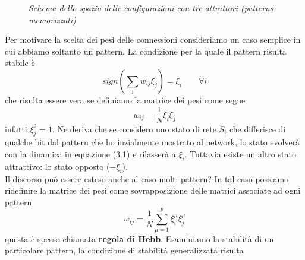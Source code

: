 \documentclass[12pt, a4paper]{book}
\theoremstyle{theorem}
\begin{document}
\begin{figure}
					\caption{\textit{Schema dello spazio delle configurazioni con tre attrattori (patterns memorizzati)}}
				\end{figure}
				
				Per motivare la scelta dei pesi delle connessioni consideriamo un caso semplice in cui abbiamo soltanto un pattern. La condizione per la quale il pattern risulta stabile è
				\begin{equation}
					sign \left( \sum_i w_{ij} \xi_j\right) = \xi_i \quad \quad \forall i
				\end{equation} 
				che risulta essere vera se definiamo la matrice dei pesi come segue
				\begin{equation}
					w_{ij} = \frac{1}{N} \xi_i\xi_j
				\end{equation}
				infatti $\xi_j^2=1$.
				Ne deriva che se considero uno stato di rete $S_i$ che differisce di qualche bit dal pattern che ho inzialmente mostrato al network, lo stato evolverà con la dinamica in equazione (3.1) e rilasserà a $\xi_i$.
				Tuttavia esiste un altro stato attrattivo: lo stato opposto ($-\xi_i$).\\
				Il discorso pu\'o essere esteso anche al caso molti pattern? In tal caso possiamo ridefinire la matrice dei pesi come sovrapposizione delle matrici associate ad ogni pattern
				\begin{equation}
					w_{ij} = \frac{1}{N} \sum_{\mu = 1}^{p} \xi_{i}^{\mu} \xi_{j}^{\mu}
				\end{equation} questa è spesso chiamata {\bf regola di Hebb}.
				Esaminiamo la stabilità di un particolare pattern, la condizione di stabilità generalizzata risulta
\end{document}

